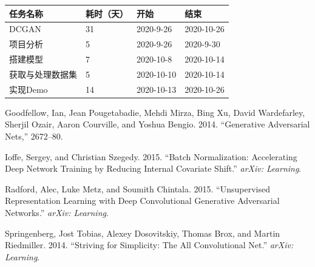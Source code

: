 \documentclass[
  hyperref, a4paper]{ctexart}
\begin{document}
\begin{longtable}[]{@{}llll@{}}
\toprule
任务名称 & 耗时（天） & 开始 & 结束\tabularnewline
\midrule
\endhead
DCGAN & 31 & 2020-9-26 & 2020-10-26\tabularnewline
项目分析 & 5 & 2020-9-26 & 2020-9-30\tabularnewline
搭建模型 & 7 & 2020-10-8 & 2020-10-14\tabularnewline
获取与处理数据集 & 5 & 2020-10-10 & 2020-10-14\tabularnewline
实现Demo & 14 & 2020-10-13 & 2020-10-26\tabularnewline
\bottomrule
\end{longtable}

\hypertarget{refs}{}
\leavevmode\hypertarget{ref-goodfellow2014generative}{}%
Goodfellow, Ian, Jean Pougetabadie, Mehdi Mirza, Bing Xu, David
Wardefarley, Sherjil Ozair, Aaron Courville, and Yoshua Bengio. 2014.
``Generative Adversarial Nets,'' 2672--80.

\leavevmode\hypertarget{ref-ioffe2015batch}{}%
Ioffe, Sergey, and Christian Szegedy. 2015. ``Batch Normalization:
Accelerating Deep Network Training by Reducing Internal Covariate
Shift.'' \emph{arXiv: Learning}.

\leavevmode\hypertarget{ref-radford2015unsupervised}{}%
Radford, Alec, Luke Metz, and Soumith Chintala. 2015. ``Unsupervised
Representation Learning with Deep Convolutional Generative Adversarial
Networks.'' \emph{arXiv: Learning}.

\leavevmode\hypertarget{ref-springenberg2014striving}{}%
Springenberg, Jost Tobias, Alexey Dosovitskiy, Thomas Brox, and Martin
Riedmiller. 2014. ``Striving for Simplicity: The All Convolutional
Net.'' \emph{arXiv: Learning}.
\end{document}
